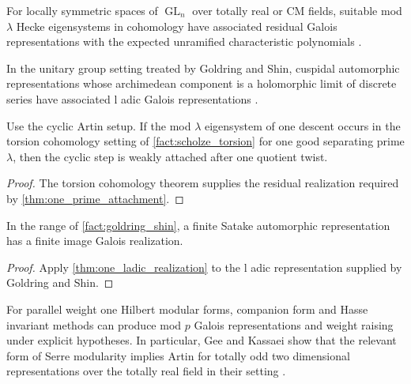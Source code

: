 \documentclass{aomart}
\theoremstyle{definition}
\theoremstyle{remark}
\newcommand{\GL}{\operatorname{GL}}
\begin{document}
\begin{standardfact}\label{fact:scholze_torsion}
For locally symmetric spaces of \(\GL_n\) over totally real or CM fields, suitable mod \(\lambda\) Hecke eigensystems in cohomology have associated residual Galois representations with the expected unramified characteristic polynomials \cite{Scholze2015}.
\end{standardfact}

\begin{standardfact}\label{fact:goldring_shin}
In the unitary group setting treated by Goldring and Shin, cuspidal automorphic representations whose archimedean component is a holomorphic limit of discrete series have associated l adic Galois representations \cite{GoldringShin2014}.
\end{standardfact}

\begin{corollary}\label{cor:scholze_attachment}
Use the cyclic Artin setup. If the mod \(\lambda\) eigensystem of one descent occurs in the torsion cohomology setting of \cref{fact:scholze_torsion} for one good separating prime \(\lambda\), then the cyclic step is weakly attached after one quotient twist.
\end{corollary}

\begin{proof}
The torsion cohomology theorem supplies the residual realization required by \cref{thm:one_prime_attachment}.
\end{proof}

\begin{corollary}\label{cor:goldring_shin_artin}
In the range of \cref{fact:goldring_shin}, a finite Satake automorphic representation has a finite image Galois realization.
\end{corollary}

\begin{proof}
Apply \cref{thm:one_ladic_realization} to the l adic representation supplied by Goldring and Shin.
\end{proof}

\begin{standardfact}\label{fact:weight_one_companion}
For parallel weight one Hilbert modular forms, companion form and Hasse invariant methods can produce mod \(p\) Galois representations and weight raising under explicit hypotheses. In particular, Gee and Kassaei show that the relevant form of Serre modularity implies Artin for totally odd two dimensional representations over the totally real field in their setting \cite{GeeKassaei2013,DimitrovWiese2020}.
\end{standardfact}
\end{document}
